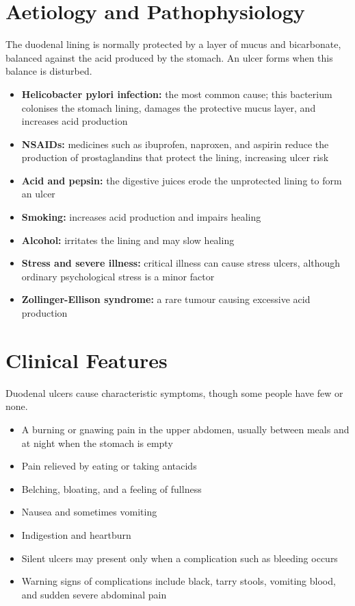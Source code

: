 \section*{Aetiology and Pathophysiology}
The duodenal lining is normally protected by a layer of mucus and bicarbonate, balanced against the acid produced by the stomach. An ulcer forms when this balance is disturbed.
\begin{itemize}
    \item \textbf{Helicobacter pylori infection:} the most common cause; this bacterium colonises the stomach lining, damages the protective mucus layer, and increases acid production
    \item \textbf{NSAIDs:} medicines such as ibuprofen, naproxen, and aspirin reduce the production of prostaglandins that protect the lining, increasing ulcer risk
    \item \textbf{Acid and pepsin:} the digestive juices erode the unprotected lining to form an ulcer
    \item \textbf{Smoking:} increases acid production and impairs healing
    \item \textbf{Alcohol:} irritates the lining and may slow healing
    \item \textbf{Stress and severe illness:} critical illness can cause stress ulcers, although ordinary psychological stress is a minor factor
    \item \textbf{Zollinger-Ellison syndrome:} a rare tumour causing excessive acid production
\end{itemize}

\section*{Clinical Features}
Duodenal ulcers cause characteristic symptoms, though some people have few or none.
\begin{itemize}
    \item A burning or gnawing pain in the upper abdomen, usually between meals and at night when the stomach is empty
    \item Pain relieved by eating or taking antacids
    \item Belching, bloating, and a feeling of fullness
    \item Nausea and sometimes vomiting
    \item Indigestion and heartburn
    \item Silent ulcers may present only when a complication such as bleeding occurs
    \item Warning signs of complications include black, tarry stools, vomiting blood, and sudden severe abdominal pain
\end{itemize}

